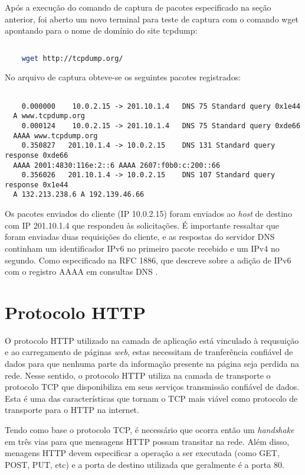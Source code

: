 \documentclass[a4paper]{report} %
\begin{document}
Após a execução do comando de captura de pacotes especificado na seção anterior, foi aberto um novo terminal para teste de captura com o comando wget apontando para o nome de domínio do site tcpdump:
\begin{lstlisting}[language=bash]

	wget http://tcpdump.org/

\end{lstlisting}

	No arquivo de captura obteve-se os seguintes pacotes registrados:

\begin{lstlisting}

	0.000000    10.0.2.15 -> 201.10.1.4   DNS 75 Standard query 0x1e44
  A www.tcpdump.org
	0.000124    10.0.2.15 -> 201.10.1.4   DNS 75 Standard query 0xde66
  AAAA www.tcpdump.org
	0.350827   201.10.1.4 -> 10.0.2.15    DNS 131 Standard query response 0xde66
  AAAA 2001:4830:116e:2::6 AAAA 2607:f0b0:c:200::66
	0.356026   201.10.1.4 -> 10.0.2.15    DNS 107 Standard query response 0x1e44
  A 132.213.238.6 A 192.139.46.66

\end{lstlisting}

	Os pacotes enviados do cliente (IP 10.0.2.15) foram enviados ao \textit{host} de destino com IP 201.10.1.4 que respondeu às solicitações. É importante ressaltar que foram enviadas duas requisições do cliente, e as respostas do servidor DNS continham um identificador IPv6 no primeiro pacote recebido e um IPv4 no segundo. Como especificado na RFC 1886, que descreve sobre a adição de IPv6 com o registro AAAA em consultas DNS \cite{IETF}.

\section{Protocolo HTTP}
\label{sec_http}
O protocolo HTTP utilizado na camada de aplicação está vinculado à requsuição e ao carregamento de páginas \textit{web}, estas necessitam de tranferência confiável de dados para que nenhuma parte da informação presente na página seja perdida na rede. Nesse sentido, o protocolo HTTP utiliza na camada de transporte o protocolo TCP que disponibiliza em seus serviços transmissão confiável de dados. Esta é uma das características que tornam o TCP mais viável como protocolo de transporte para o HTTP na internet. 

	Tendo como base o protocolo TCP, é necessário que ocorra então um \textit{handshake} em três vias para que mensagens HTTP possam transitar na rede. Além disso, menagens HTTP devem especificar a operação a ser executada (como GET, POST, PUT, etc) e a porta de destino utilizada que geralmente é a porta 80. 
\end{document}
